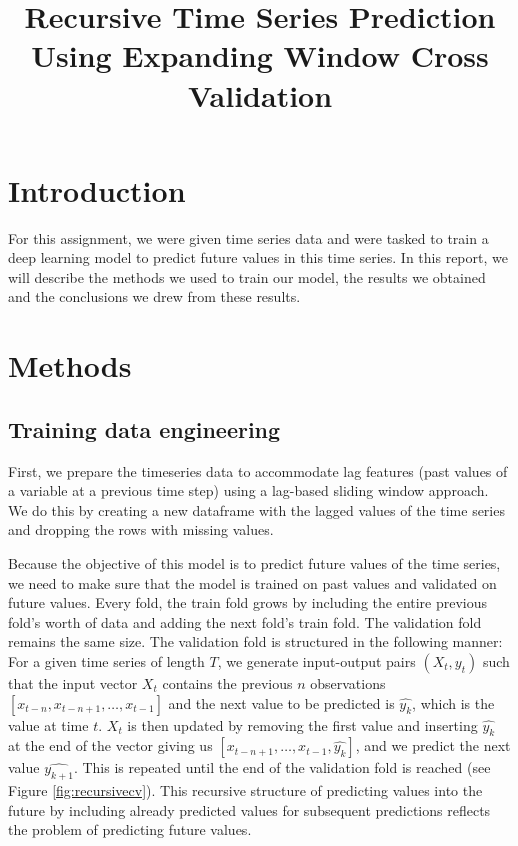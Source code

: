\documentclass[conference]{IEEEtran}
\begin{document}
\title{Recursive Time Series Prediction Using Expanding Window Cross Validation\\}

\author{
\and
{}
\and
{}
\and
{}
}

\maketitle

\section{Introduction}
For this assignment, we were given time series data and were tasked to train a deep learning model
to predict future values in this time series. In this report, we will describe the methods we used 
to train our model, the results we obtained and the conclusions we drew from these results.

\section{Methods}
\subsection{Training data engineering}\label{traindataengineer}
First, we prepare the timeseries data to accommodate lag features (past values of a variable at a
previous time step) using a lag-based sliding window approach. We do this by creating a new 
dataframe with the lagged values of the time series and dropping the rows with missing values.

Because the objective of this model is to predict future values of the time series, we need to
make sure that the model is trained on past values and validated on future values. Every fold, the 
train fold grows by including the entire previous fold's worth of data and adding the next fold's train fold.  
The validation fold remains the same size. The validation fold is structured in the following manner:
For a given time series of length $T$, we generate input-output pairs $(X_t,y_t)$ such that the 
input vector $X_t$ contains the previous $n$ observations $[x_{t-n}, x_{t-n+1}, \ldots, x_{t-1}]$ 
and the next value to be predicted is $\hat{y_k}$, which is the value at time $t$. $X_t$ is then 
updated by removing the first value and inserting $\hat{y_k}$ at the end of the vector giving us
$[x_{t-n+1}, \ldots, x_{t-1}, \hat{y_k}]$, and we predict the next value $\hat{y_{k+1}}$. This is 
repeated until the end of the validation fold is reached (see Figure \ref{fig:recursivecv}). This recursive structure of predicting 
values into the future by including already predicted values for subsequent predictions reflects 
the problem of predicting future values. 
\end{document}
